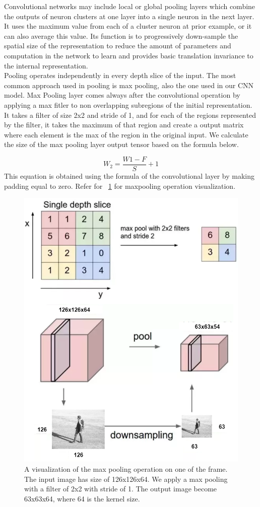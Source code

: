 Convolutional networks may include local or global pooling layers which combine the outputs of neuron clusters at one layer into a single neuron in the next layer. It uses the maximum value from each of a cluster neuron at prior example, or it can also average this value. Its function is to progressively down-sample the spatial size of the representation to reduce the amount of parameters and computation in the network to learn and provides basic translation invariance to the internal representation.\\

Pooling operates independently in every depth slice of the input. The most common approach used in pooling is max pooling, also the one used in our CNN model. Max Pooling layer comes always after the convolutional operation by applying a max fitler to non overlapping subregions of the initial representation. It takes a filter of size 2x2 and stride of 1, and for each of the regions represented by the filter, it takes the maximum of that region and create a output matrix where each element is the max of the region in the original input. We calculate the size of the max pooling layer output tensor based on the formula below.

\begin{equation}
 W_{2}=\frac{W1-F}{S} +1
\end{equation}
This equation is obtained using the formula of the convolutional layer by making padding equal to zero. Refer for ~\ref{fig:maxpoolinglayervisualization} for maxpooling operation visualization.
\begin{figure}[ht]
\centering
\includegraphics[width=0.6\columnwidth]{Figures/mp3.png}
\decoRule
\caption[A visualization of the max pooling operation on one of the frame. The input image has size of 126x126x64. We apply a max pooling with a filter of 2x2 with stride of 1. The output image become 63x63x64, where 64 is the kernel size.]{A visualization of the max pooling operation on one of the frame. The input image has size of 126x126x64. We apply a max pooling with a filter of 2x2 with stride of 1. The output image become 63x63x64, where 64 is the kernel size.}
\label{fig:maxpoolinglayervisualization}
\end{figure}

